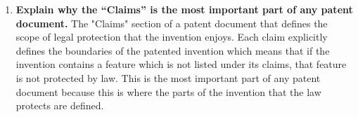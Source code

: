 \documentclass{article}
\begin{document}
\begin{enumerate}
  \item \textbf{Explain why the “Claims” is the most important part of any patent document.}
  \subitem The "Claims" section of a patent document that defines the scope of legal protection that the invention enjoys. Each claim explicitly defines the boundaries of the patented invention which means that if the invention contains a feature which is not listed under its claims, that feature is not protected by law. 
  \subitem This is the most important part of any patent document because this is where the parts of the invention that the law protects are defined.

\end{enumerate}



\end{document}
